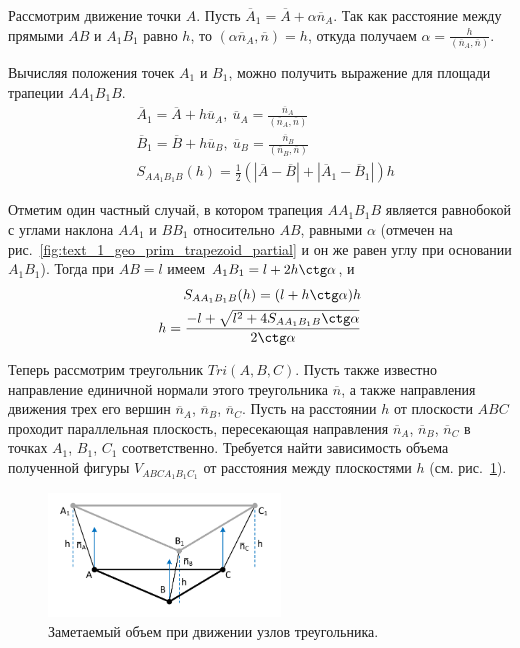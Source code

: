 Рассмотрим движение точки $A$.
Пусть $\overline{A}_1 = \overline{A} + \alpha \overline{n}_A$.
Так как расстояние между прямыми $AB$ и $A_1B_1$ равно $h$, то $(\alpha \overline{n}_A, \overline{n}) = h$, откуда получаем $\alpha = \frac{h}{(\overline{n}_A, \overline{n})}$.

Вычисляя положения точек $A_1$ и $B_1$, можно получить выражение для площади трапеции $AA_1B_1B$.
\begin{equation}\label{eqn:text_1_geo_prim_aa1b1b}
	\begin{aligned}
		& \overline{A}_1 = \overline{A} + h \overline{u}_A, \ \overline{u}_A = \frac{\overline{n}_A}{(\overline{n}_A, \overline{n})} \\
		& \overline{B}_1 = \overline{B} + h \overline{u}_B, \ \overline{u}_B = \frac{\overline{n}_B}{(\overline{n}_B, \overline{n})} \\
		& S_{AA_1B_1B}(h) = \frac{1}{2} \left( |\overline{A} - \overline{B}| + |\overline{A}_1 - \overline{B}_1| \right) h
	\end{aligned}
\end{equation}

Отметим один частный случай, в котором трапеция $AA_1B_1B$ является равнобокой с углами наклона $AA_1$ и $BB_1$ относительно $AB$, равными $\alpha$ (отмечен на рис.~\ref{fig:text_1_geo_prim_trapezoid_partial} и он же равен углу при основании $A_1B_1$).
Тогда при $AB = l$ имеем $A_1B_1 = l + 2 h \ctg \alpha$, и
\begin{equation}\label{eqn:text_1_geo_prim_trapezium_h_from_s}
	\begin{aligned}
		S_{AA_1B_1B}(h) = (l + h \ctg \alpha) h \\
		h = \frac{-l + \sqrt{l^2 + 4 S_{AA_1B_1B} \ctg \alpha}}{2 \ctg \alpha}
	\end{aligned}
\end{equation}

Теперь рассмотрим треугольник $Tri(A, B, C)$.
Пусть также известно направление единичной нормали этого треугольника $\overline{n}$, а также направления движения трех его вершин $\overline{n}_A$, $\overline{n}_B$, $\overline{n}_C$.
Пусть на расстоянии $h$ от плоскости $ABC$ проходит параллельная плоскость, пересекающая направления $\overline{n}_A$, $\overline{n}_B$, $\overline{n}_C$ в точках $A_1$, $B_1$, $C_1$ соответственно.
Требуется найти зависимость объема полученной фигуры $V_{ABCA_1B_1C_1}$ от расстояния между плоскостями $h$ (см. рис.~\ref{fig:text_1_geo_prim_pyramid_partial}).

\begin{figure}[ht]
\centering
\includegraphics[width=0.55\textwidth]{./pics/text_1_geo_prim/pyramid_partial.pdf}
\singlespacing
{}\caption{Заметаемый объем при движении узлов треугольника.}
\label{fig:text_1_geo_prim_pyramid_partial}
\end{figure}

